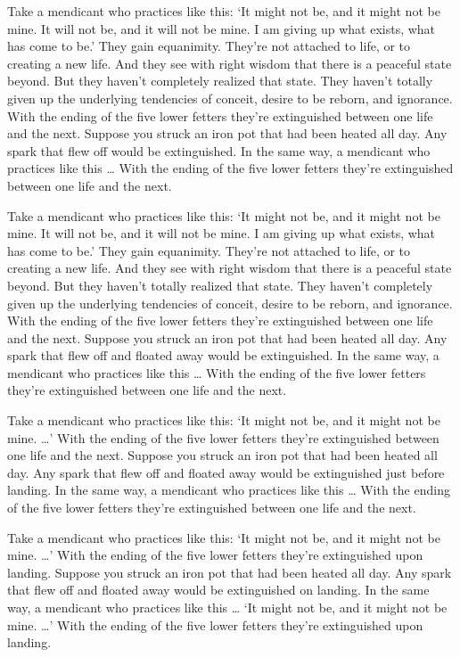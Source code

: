 \documentclass[12pt,openany]{book}%
\begin{document}
Take a mendicant who practices like this: ‘It might not be, and it might not be mine. It will not be, and it will not be mine. I am giving up what exists, what has come to be.’ They gain equanimity. They’re not attached to life, or to creating a new life. And they see with right wisdom that there is a peaceful state beyond. But they haven’t completely realized that state. They haven’t totally given up the underlying tendencies of conceit, desire to be reborn, and ignorance. With the ending of the five lower fetters they’re extinguished between one life and the next. Suppose you struck an iron pot that had been heated all day. Any spark that flew off would be extinguished. In the same way, a mendicant who practices like this … With the ending of the five lower fetters they’re extinguished between one life and the next. 

Take a mendicant who practices like this: ‘It might not be, and it might not be mine. It will not be, and it will not be mine. I am giving up what exists, what has come to be.’ They gain equanimity. They’re not attached to life, or to creating a new life. And they see with right wisdom that there is a peaceful state beyond. But they haven’t totally realized that state. They haven’t completely given up the underlying tendencies of conceit, desire to be reborn, and ignorance. With the ending of the five lower fetters they’re extinguished between one life and the next. Suppose you struck an iron pot that had been heated all day. Any spark that flew off and floated away would be extinguished. In the same way, a mendicant who practices like this … With the ending of the five lower fetters they’re extinguished between one life and the next. 

Take a mendicant who practices like this: ‘It might not be, and it might not be mine. …’ With the ending of the five lower fetters they’re extinguished between one life and the next. Suppose you struck an iron pot that had been heated all day. Any spark that flew off and floated away would be extinguished just before landing. In the same way, a mendicant who practices like this … With the ending of the five lower fetters they’re extinguished between one life and the next. 

Take a mendicant who practices like this: ‘It might not be, and it might not be mine. …’ With the ending of the five lower fetters they’re extinguished upon landing. Suppose you struck an iron pot that had been heated all day. Any spark that flew off and floated away would be extinguished on landing. In the same way, a mendicant who practices like this … ‘It might not be, and it might not be mine. …’ With the ending of the five lower fetters they’re extinguished upon landing. 
\end{document}
